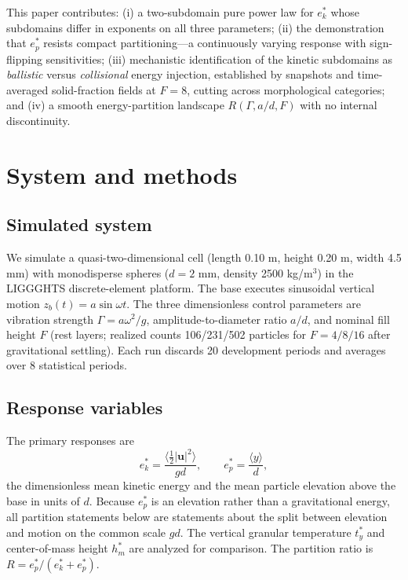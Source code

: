 \documentclass[aps,pre,twocolumn,superscriptaddress,floatfix]{revtex4-2}
\begin{document}
This paper contributes: (i) a two-subdomain pure power law for $e_k^*$ whose subdomains differ in exponents on all three parameters; (ii) the demonstration that $e_p^*$ resists compact partitioning---a continuously varying response with sign-flipping sensitivities; (iii) mechanistic identification of the kinetic subdomains as \emph{ballistic} versus \emph{collisional} energy injection, established by snapshots and time-averaged solid-fraction fields at $F=8$, cutting across morphological categories; and (iv) a smooth energy-partition landscape $R(\Gamma,a/d,F)$ with no internal discontinuity.

\section{System and methods}
\label{sec:methods}

\subsection{Simulated system}
We simulate a quasi-two-dimensional cell (length 0.10 m, height 0.20 m, width 4.5 mm) with monodisperse spheres ($d=2$ mm, density 2500 kg/m$^3$) in the LIGGGHTS discrete-element platform. The base executes sinusoidal vertical motion $z_b(t)=a\sin\omega t$. The three dimensionless control parameters are vibration strength $\Gamma=a\omega^2/g$, amplitude-to-diameter ratio $a/d$, and nominal fill height $F$ (rest layers; realized counts 106/231/502 particles for $F=4/8/16$ after gravitational settling). Each run discards 20 development periods and averages over 8 statistical periods.

\subsection{Response variables}
The primary responses are
\begin{equation}
e_k^*=\frac{\langle \tfrac12|\mathbf u|^2\rangle}{gd},\qquad
e_p^*=\frac{\langle y\rangle}{d},
\label{eq:responses}
\end{equation}
the dimensionless mean kinetic energy and the mean particle elevation above the base in units of $d$. Because $e_p^*$ is an elevation rather than a gravitational energy, all partition statements below are statements about the split between elevation and motion on the common scale $gd$. The vertical granular temperature $t_y^*$ and center-of-mass height $h_m^*$ are analyzed for comparison. The partition ratio is $R=e_p^*/(e_k^*+e_p^*)$.
\end{document}
